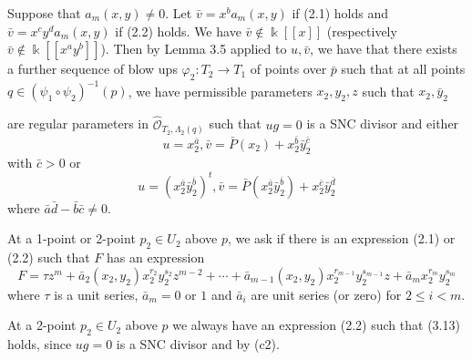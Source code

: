 \documentclass[11pt]{article}
\theoremstyle{plain}
\newcommand{\Oh}[1]{\widehat{\mathcal{O}}_{#1}}
\begin{document}
Suppose that $a_m(x, y) \neq 0$. Let $\bar{v} = x^b a_m(x, y)$ if (2.1) holds and $\bar{v} = x^c y^d a_m(x, y)$ if (2.2) holds. We have $\bar{v} \notin \Bbbk[[x]]$ (respectively $\bar{v} \notin \Bbbk[[x^a y^b]]$). Then by Lemma 3.5 applied to $u, \bar{v}$, we have that there exists a further sequence of blow ups $\varphi_2 : T_2 \to T_1$ of points over $\bar{p}$ such that at all points $q \in (\psi_1 \circ \psi_2)^{-1}(p)$, we have permissible parameters $x_2, y_2, z$ such that $x_2, \bar{y}_2$


are regular parameters in $\Oh{T_2,\Lambda_2(q)}$ such that $ug = 0$ is a SNC divisor and either
\begin{equation}
u = x_2^{\bar{a}}, \bar{v} = \bar{P}(x_2) + x_2^{\bar{b}} \bar{y}_2^{\bar{c}}
\tag{c1}
\end{equation}
with $\bar{c} > 0$ or
\begin{equation}
u = (x_2^{\bar{a}} \bar{y}_2^{\bar{b}})^t, \bar{v} = \bar{P}(x_2^{\bar{a}} \bar{y}_2^{\bar{b}}) + x_2^{\bar{c}} \bar{y}_2^{\bar{d}}
\tag{c2}
\end{equation}
where $\bar{a}\bar{d} - \bar{b}\bar{c} \neq 0$.

At a 1-point or 2-point $p_2 \in U_2$ above $p$, we ask if there is an expression (2.1) or (2.2) such that $F$ has an expression
\begin{equation}
F = \tau z^m + \bar{a}_2(x_2, y_2) x_2^{r_2} y_2^{s_2} z^{m-2} + \cdots + \bar{a}_{m-1}(x_2, y_2) x_2^{r_{m-1}} y_2^{s_{m-1}} z + \bar{a}_m x_2^{r_m} y_2^{s_m}
\tag{3.13}
\end{equation}
where $\tau$ is a unit series, $\bar{a}_m = 0$ or $1$ and $\bar{a}_i$ are unit series (or zero) for $2 \leqslant i < m$.

At a 2-point $p_2 \in U_2$ above $p$ we always have an expression (2.2) such that (3.13) holds, since $ug = 0$ is a SNC divisor and by (c2).
\end{document}
